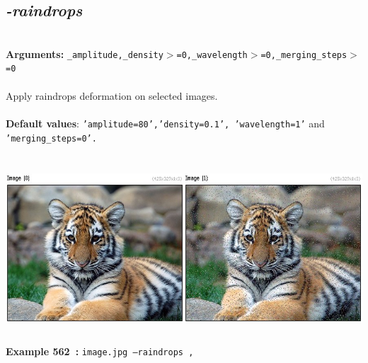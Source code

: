 \documentclass[a4paper,11pt,twoside]{book}
\begin{document}
\subsection{\emph{-raindrops} }\vspace*{-0.5em}
~\\\textbf{Arguments: } 
{\small \texttt{\_amplitude,\_density$>$=0,\_wavelength$>$=0,\_merging\_steps$>$=0}}\\~\\
Apply raindrops deformation on selected images.
~\\~\\\textbf{Default values}: {\small \texttt{'amplitude=80','density=0.1', 'wavelength=1'} and \texttt{'merging\_steps=0'.}}
\begin{center}\includegraphics[keepaspectratio=true,height=7cm,width=\textwidth]{img/gmic_def562.jpg}\\
{\footnotesize \textbf{Example 562~:} \texttt{image.jpg --raindrops ,}}
\end{center}
\end{document}
